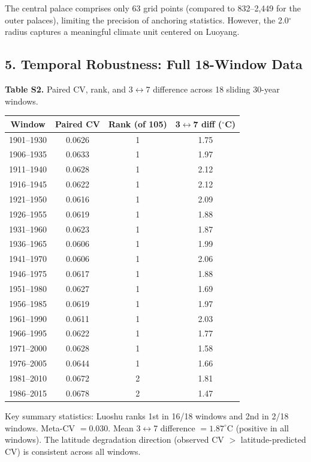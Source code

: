 \documentclass[10pt]{article}
\begin{document}
The central palace comprises only 63 grid points (compared to 832--2,449 for the outer palaces), limiting the precision of anchoring statistics. However, the 2.0$^\circ$ radius captures a meaningful climate unit centered on Luoyang.

\subsection*{5. Temporal Robustness: Full 18-Window Data}

\textbf{Table S2.} Paired CV, rank, and 3$\leftrightarrow$7 difference across 18 sliding 30-year windows.

\vspace{6pt}

\begin{tabular}{cccc}
\toprule
Window & Paired CV & Rank (of 105) & 3$\leftrightarrow$7 diff ($^\circ$C) \\
\midrule
1901--1930 & 0.0626 & 1 & 1.75 \\
1906--1935 & 0.0633 & 1 & 1.97 \\
1911--1940 & 0.0628 & 1 & 2.12 \\
1916--1945 & 0.0622 & 1 & 2.12 \\
1921--1950 & 0.0616 & 1 & 2.09 \\
1926--1955 & 0.0619 & 1 & 1.88 \\
1931--1960 & 0.0623 & 1 & 1.87 \\
1936--1965 & 0.0606 & 1 & 1.99 \\
1941--1970 & 0.0606 & 1 & 2.06 \\
1946--1975 & 0.0617 & 1 & 1.88 \\
1951--1980 & 0.0627 & 1 & 1.69 \\
1956--1985 & 0.0619 & 1 & 1.97 \\
1961--1990 & 0.0611 & 1 & 2.03 \\
1966--1995 & 0.0622 & 1 & 1.77 \\
1971--2000 & 0.0628 & 1 & 1.58 \\
1976--2005 & 0.0644 & 1 & 1.66 \\
1981--2010 & 0.0672 & 2 & 1.81 \\
1986--2015 & 0.0678 & 2 & 1.47 \\
\bottomrule
\end{tabular}

\vspace{6pt}
\noindent Key summary statistics: Luoshu ranks 1st in 16/18 windows and 2nd in 2/18 windows. Meta-CV $= 0.030$. Mean 3$\leftrightarrow$7 difference $= 1.87^\circ$C (positive in all windows). The latitude degradation direction (observed CV $>$ latitude-predicted CV) is consistent across all windows.
\end{document}
